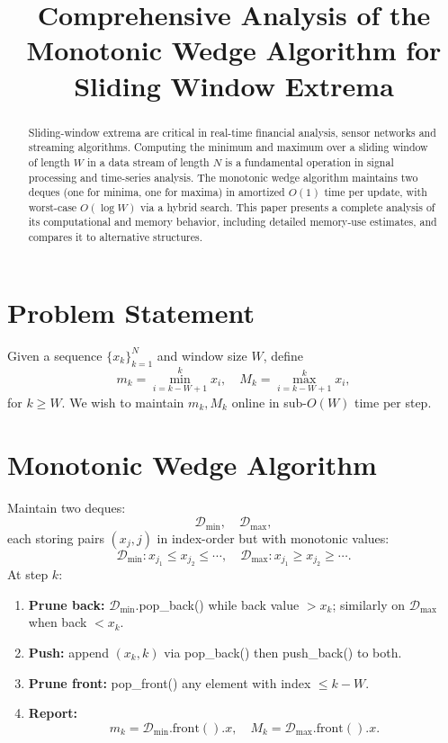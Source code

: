 \documentclass[12pt,letterpaper]{article}
\title{Comprehensive Analysis of the Monotonic Wedge Algorithm for Sliding Window Extrema}
\date{}
\begin{document}
\maketitle

\begin{abstract}
Sliding-window extrema are critical in real-time financial analysis, sensor networks and streaming algorithms. Computing the minimum and maximum over a sliding window of length \(W\) in a data stream of length \(N\) is a fundamental operation in signal processing and time-series analysis. The monotonic wedge algorithm maintains two deques (one for minima, one for maxima) in amortized \(O(1)\) time per update, with worst-case \(O(\log W)\) via a hybrid search. This paper presents a complete analysis of its computational and memory behavior, including detailed memory-use estimates, and compares it to alternative structures.
\end{abstract}

\section{Problem Statement}
Given a sequence \(\{x_k\}_{k=1}^N\) and window size \(W\), define
\[
  m_k = \min_{i=k-W+1}^k x_i,\quad
  M_k = \max_{i=k-W+1}^k x_i,
\]
for \(k\ge W\).  We wish to maintain \(m_k, M_k\) online in sub-\(O(W)\) time per step.

\section{Monotonic Wedge Algorithm}
Maintain two deques:
\[
  \mathcal{D}_{\min},\quad \mathcal{D}_{\max},
\]
each storing pairs \((x_j,j)\) in index-order but with monotonic values:
\[
  \mathcal{D}_{\min}: x_{j_1}\le x_{j_2}\le\cdots,\quad
  \mathcal{D}_{\max}: x_{j_1}\ge x_{j_2}\ge\cdots.
\]
At step \(k\):
\begin{enumerate}
  \item \textbf{Prune back:}
    \(\mathcal{D}_{\min}.\)pop\_back() while back value \(>x_k\);
    similarly on \(\mathcal{D}_{\max}\) when back \(<x_k\).
  \item \textbf{Push:}
    append \((x_k,k)\) via pop\_back() then push\_back() to both.
  \item \textbf{Prune front:}
    pop\_front() any element with index \(\le k-W\).
  \item \textbf{Report:}
    \[
      m_k = \mathcal{D}_{\min}.\mathrm{front}().x,\quad
      M_k = \mathcal{D}_{\max}.\mathrm{front}().x.
    \]
\end{enumerate}
\end{document}
